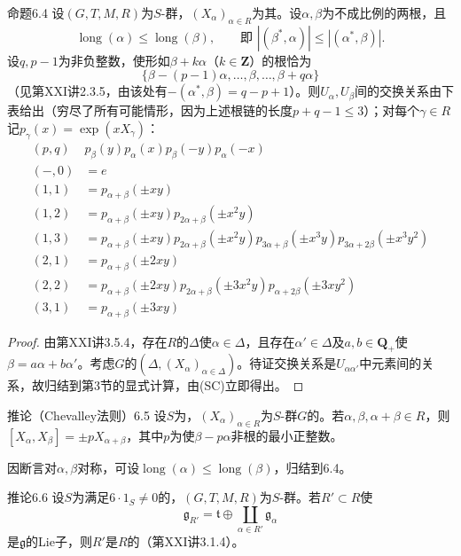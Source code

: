 \begin{SGAresult}{命题}{6.4}
设$(G,T,M,R)$为$S$-群，$(X_\alpha)_{\alpha\in R}$为其。设$\alpha,\beta$为不成比例的两根，且
\[\operatorname{long}(\alpha)\leq\operatorname{long}(\beta),\qquad\text{即 }|(\beta^*,\alpha)|\leq|(\alpha^*,\beta)|.\]
设$q,p-1$为非负整数，使形如$\beta+k\alpha$（$k\in\mathbf Z$）的根恰为
\[\{\beta-(p-1)\alpha,\ldots,\beta,\ldots,\beta+q\alpha\}\]
（见第XXI讲2.3.5，由该处有$-(\alpha^*,\beta)=q-p+1$）。则$U_\alpha,U_\beta$间的交换关系由下表给出（穷尽了所有可能情形，因为上述根链的长度$p+q-1\leq3$）；对每个$\gamma\in R$记$p_\gamma(x)=\exp(xX_\gamma)$：
\[\begin{array}{c|l}(p,q)&p_\beta(y)p_\alpha(x)p_\beta(-y)p_\alpha(-x)\\\hline
(-,0)&=e\\(1,1)&=p_{\alpha+\beta}(\pm xy)\\(1,2)&=p_{\alpha+\beta}(\pm xy)p_{2\alpha+\beta}(\pm x^2y)\\(1,3)&=p_{\alpha+\beta}(\pm xy)p_{2\alpha+\beta}(\pm x^2y)p_{3\alpha+\beta}(\pm x^3y)p_{3\alpha+2\beta}(\pm x^3y^2)\\(2,1)&=p_{\alpha+\beta}(\pm2xy)\\(2,2)&=p_{\alpha+\beta}(\pm2xy)p_{2\alpha+\beta}(\pm3x^2y)p_{\alpha+2\beta}(\pm3xy^2)\\(3,1)&=p_{\alpha+\beta}(\pm3xy)\end{array}\]
\end{SGAresult}
\begin{proof}
由第XXI讲3.5.4，存在$R$的$\Delta$使$\alpha\in\Delta$，且存在$\alpha'\in\Delta$及$a,b\in\mathbf Q_+$使$\beta=a\alpha+b\alpha'$。考虑$G$的$(\Delta,(X_\alpha)_{\alpha\in\Delta})$。待证交换关系是$U_{\alpha\alpha'}$中元素间的关系，故归结到第3节的显式计算，由(SC)立即得出。
\end{proof}
\begin{SGAresult}{推论（Chevalley法则）}{6.5}
设$S$为，$(X_\alpha)_{\alpha\in R}$为$S$-群$G$的。若$\alpha,\beta,\alpha+\beta\in R$，则$[X_\alpha,X_\beta]=\pm pX_{\alpha+\beta}$，其中$p$为使$\beta-p\alpha$非根的最小正整数。
\end{SGAresult}
因断言对$\alpha,\beta$对称，可设$\operatorname{long}(\alpha)\leq\operatorname{long}(\beta)$，归结到6.4。
\begin{SGAresult}{推论}{6.6}
设$S$为满足$6\cdot1_S\ne0$的，$(G,T,M,R)$为$S$-群。若$R'\subset R$使
\[\mathfrak g_{R'}=\mathfrak t\oplus\coprod_{\alpha\in R'}\mathfrak g_\alpha\tag{*}\]
是$\mathfrak g$的Lie子，则$R'$是$R$的（第XXI讲3.1.4）。
\end{SGAresult}
